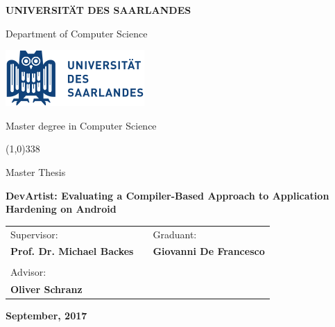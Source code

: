 \begin{titlepage}
  \pagestyle{empty}

  \begin{center}
    {\bfseries\Large {\huge U}NIVERSIT{\"A}T DES {\huge S}AARLANDES}

    \vspace{0.2cm}

    {\large Department of Computer Science}

    \vspace{0.5cm}

    \begin{center}
      \includegraphics{img/logo_uds.png}
    \end{center}

    \vspace{0.5cm}

    {\Large Master degree in Computer Science}

    \vspace{0.2cm}
    \line(1,0){338}
    \vspace{0.5cm}

    {\Large Master Thesis}

    \vspace{2.0cm}

    {\Large \bfseries {DevArtist: Evaluating a Compiler-Based Approach to Application Hardening on Android}}

    \vspace{0.3cm}
    

    \large
    \begin{center}
      \begin{tabular}{lcl}
        Supervisor: & \hspace{4cm} &  \hspace{1.5cm} Graduant: \\
        {\bfseries Prof. Dr. Michael Backes} & \hspace{2cm} & {\bfseries Giovanni De Francesco } \\ \\
        Advisor: \\ {\bfseries Oliver Schranz}
      \end{tabular}
    \end{center}
    \vspace{2.0cm}

    {\large \bfseries September, 2017}
    \vfill

  \end{center}

\end{titlepage}
